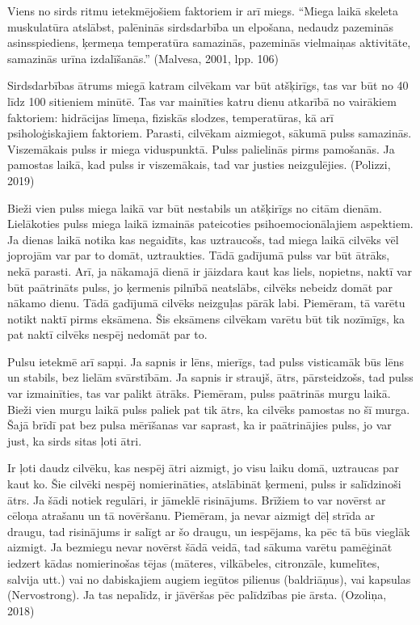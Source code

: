 \documentclass[12pt]{article}
\begin{document}
Viens no sirds ritmu ietekmējošiem faktoriem ir arī miegs.
“Miega laikā skeleta muskulatūra atslābst, palēninās sirdsdarbība un elpošana, nedaudz pazeminās asinsspiediens, ķermeņa temperatūra samazinās, pazeminās vielmaiņas aktivitāte, samazinās urīna izdalīšanās.” (Malvesa, 2001, lpp. 106) \par
Sirdsdarbības ātrums miegā katram cilvēkam var būt atšķirīgs, tas var būt no 40 līdz 100 sitieniem minūtē. Tas var mainīties katru dienu atkarībā no vairākiem faktoriem: hidrācijas līmeņa, fiziskās slodzes, temperatūras, kā arī psiholoģiskajiem faktoriem. Parasti, cilvēkam aizmiegot, sākumā pulss samazinās. Viszemākais pulss ir miega viduspunktā. Pulss palielinās pirms pamošanās. Ja pamostas laikā, kad pulss ir viszemākais, tad var justies neizgulējies. (Polizzi, 2019) \par
Bieži vien pulss miega laikā var būt nestabils un atšķirīgs no citām dienām. Lielākoties pulss miega laikā izmainās pateicoties psihoemocionālajiem aspektiem. Ja dienas laikā notika kas negaidīts, kas uztraucošs, tad miega laikā cilvēks vēl joprojām var par to domāt, uztraukties. Tādā gadījumā pulss var būt ātrāks, nekā parasti. Arī, ja nākamajā dienā ir jāizdara kaut kas liels, nopietns, naktī var būt paātrināts pulss, jo ķermenis pilnībā neatslābs, cilvēks nebeidz domāt par nākamo dienu. Tādā gadījumā cilvēks neizguļas pārāk labi. Piemēram, tā varētu notikt naktī pirms eksāmena. Šis eksāmens cilvēkam varētu būt tik nozīmīgs, ka pat naktī cilvēks nespēj nedomāt par to. \par
Pulsu ietekmē arī sapņi. Ja sapnis ir lēns, mierīgs, tad pulss visticamāk būs lēns un stabils, bez lielām svārstībām. Ja sapnis ir straujš, ātrs, pārsteidzošs, tad pulss var izmainīties, tas var palikt ātrāks. Piemēram, pulss paātrinās murgu laikā. Bieži vien murgu laikā pulss paliek pat tik ātrs, ka cilvēks pamostas no šī murga. Šajā brīdī pat bez pulsa mērīšanas var saprast, ka ir paātrinājies pulss, jo var just, ka sirds sitas ļoti ātri. \par
Ir ļoti daudz cilvēku, kas nespēj ātri aizmigt, jo visu laiku domā, uztraucas par kaut ko. Šie cilvēki nespēj nomierināties, atslābināt ķermeni, pulss ir salīdzinoši ātrs. Ja šādi notiek regulāri, ir jāmeklē risinājums. Brīžiem to var novērst ar cēloņa atrašanu un tā novēršanu. Piemēram, ja nevar aizmigt dēļ strīda ar draugu, tad risinājums ir salīgt ar šo draugu, un iespējams, ka pēc tā būs vieglāk aizmigt. Ja bezmiegu nevar novērst šādā veidā, tad sākuma varētu pamēģināt iedzert kādas nomierinošas tējas (māteres, vilkābeles, citronzāle, kumelītes, salvija utt.) vai no dabiskajiem augiem iegūtos pilienus (baldriāņus), vai kapsulas (Nervostrong). Ja tas nepalīdz, ir jāvēršas pēc palīdzības pie ārsta.
 (Ozoliņa, 2018) 
\end{document}
